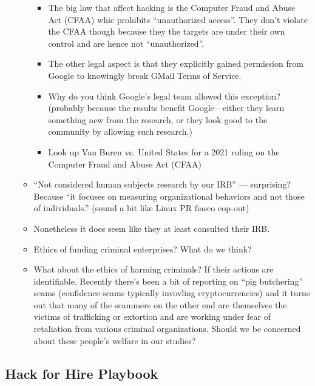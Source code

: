 \documentclass[11pt]{article}
\begin{document}
\begin{itemize}
\begin{itemize}
            \begin{itemize}
                \item The big law that affect hacking is the Computer Fraud and Abuse Act (CFAA) whic prohibits ``unauthorized access''. They don't violate the CFAA though because they the targets are under their own control and are hence not ``unauthorized''.
                \item The other legal aspect is that they explicitly gained permission from Google to knowingly break GMail Terms of Service. 
                \item Why do you think Google's legal team allowed this exception? (probably because the results benefit Google---either they learn something new from the research, or they look good to the community by allowing such research.)
                \item Look up Van Buren vs. United States for a 2021 ruling on the Computer Fraud and Abuse Act (CFAA)
            \end{itemize}
            \item ``Not considered human subjects research by our IRB'' --- surprising? Because ``it focuses on measuring organizational behaviors and not those of individuals.'' (sound a bit like Linux PR fiasco cop-out)
            \item Nonetheless it does seem like they at least consulted their IRB.
            \item Ethics of funding criminal enterprises? What do we think?
            \item What about the ethics of harming criminals? If their actions are identifiable. Recently there's been a bit of reporting on ``pig butchering'' scams (confidence scams typically invovling cryptocurrencies) and it turns out that many of the scammers on the other end are themselves the victims of trafficking or extortion and are working under fear of retaliation from various criminal organizations. Should we be concerned about these people's welfare in our studies? 
        \end{itemize}
    \end{itemize}

\subsection{Hack for Hire Playbook}
    
\end{document}
